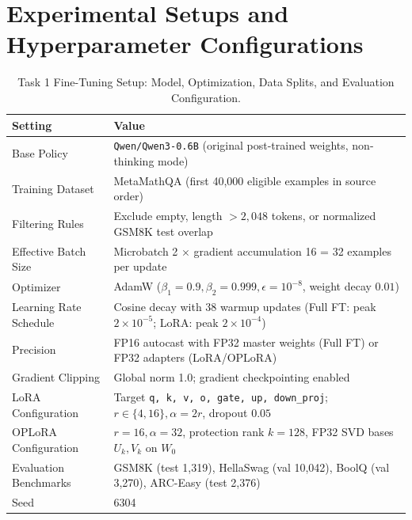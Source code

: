 \documentclass{article}
\begin{document}
\clearpage
\appendix

\section{Experimental Setups and Hyperparameter Configurations}
\label{sec:app_setups}

\begin{table}[htbp]
    \centering
    \caption{Task 1 Fine-Tuning Setup: Model, Optimization, Data Splits, and Evaluation Configuration.}
    \label{tab:app_t1_setup}
    \small
    \begin{tabular}{ll}
        \toprule
        Setting & Value \\
        \midrule
        Base Policy & \texttt{Qwen/Qwen3-0.6B} (original post-trained weights, non-thinking mode) \\
        Training Dataset & MetaMathQA (first 40,000 eligible examples in source order) \\
        Filtering Rules & Exclude empty, length $> 2,048$ tokens, or normalized GSM8K test overlap \\
        Effective Batch Size & Microbatch 2 $\times$ gradient accumulation 16 = 32 examples per update \\
        Optimizer & AdamW ($\beta_1=0.9, \beta_2=0.999, \epsilon=10^{-8}$, weight decay $0.01$) \\
        Learning Rate Schedule & Cosine decay with 38 warmup updates (Full FT: peak $2\times 10^{-5}$; LoRA: peak $2\times 10^{-4}$) \\
        Precision & FP16 autocast with FP32 master weights (Full FT) or FP32 adapters (LoRA/OPLoRA) \\
        Gradient Clipping & Global norm 1.0; gradient checkpointing enabled \\
        LoRA Configuration & Target \texttt{q, k, v, o, gate, up, down\_proj}; $r \in \{4, 16\}, \alpha=2r$, dropout $0.05$ \\
        OPLoRA Configuration & $r=16, \alpha=32$, protection rank $k=128$, FP32 SVD bases $U_k, V_k$ on $W_0$ \\
        Evaluation Benchmarks & GSM8K (test 1,319), HellaSwag (val 10,042), BoolQ (val 3,270), ARC-Easy (test 2,376) \\
        Seed & 6304 \\
        \bottomrule
    \end{tabular}
\end{table}
\end{document}
